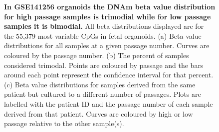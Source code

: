 \documentclass[a4paper]{article}
\begin{document}
\begin{figure}
\begin{flushleft}
\caption{\textbf{In GSE141256 organoids the DNAm beta value distribution for high passage samples is trimodial while for low passage samples it is bimodial.} All beta distributions displayed are for the 55,379 most variable CpGs in fetal organoids. (a) Beta value distributions for all samples at a given passage number. Curves are coloured by the passage number. (b) The percent of samples considered trimodal. Points are coloured by passage and the bars around each point represent the confidence interval for that percent. (c) Beta value distributions for samples derived from the same patient but cultured to a different number of passages. Plots are labelled with the patient ID and the passage number of each sample derived from that patient. Curves are coloured by high or low passage relative to the other sample(s).}
\label{fig:GSE141256}
\end{flushleft}
\end{figure}
\end{document}
